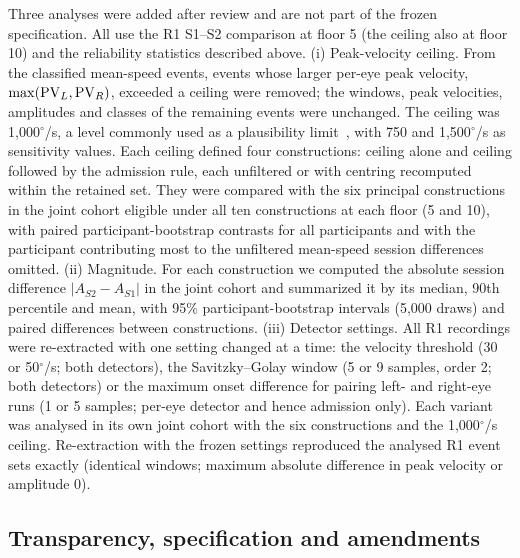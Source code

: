 Three analyses were added after review and are not part of the frozen specification. All use the R1 S1--S2 comparison at floor 5 (the ceiling also at floor 10) and the reliability statistics described above. (i) Peak-velocity ceiling. From the classified mean-speed events, events whose larger per-eye peak velocity, $\max(\mathrm{PV}_L, \mathrm{PV}_R)$, exceeded a ceiling were removed; the windows, peak velocities, amplitudes and classes of the remaining events were unchanged. The ceiling was 1,000$^\circ$/s, a level commonly used as a plausibility limit~\citep{nystrom2010}, with 750 and 1,500$^\circ$/s as sensitivity values. Each ceiling defined four constructions: ceiling alone and ceiling followed by the admission rule, each unfiltered or with centring recomputed within the retained set. They were compared with the six principal constructions in the joint cohort eligible under all ten constructions at each floor (5 and 10), with paired participant-bootstrap contrasts for all participants and with the participant contributing most to the unfiltered mean-speed session differences omitted. (ii) Magnitude. For each construction we computed the absolute session difference $|A_{S2} - A_{S1}|$ in the joint cohort and summarized it by its median, 90th percentile and mean, with 95\% participant-bootstrap intervals (5,000 draws) and paired differences between constructions. (iii) Detector settings. All R1 recordings were re-extracted with one setting changed at a time: the velocity threshold (30 or 50$^\circ$/s; both detectors), the Savitzky--Golay window (5 or 9 samples, order 2; both detectors) or the maximum onset difference for pairing left- and right-eye runs (1 or 5 samples; per-eye detector and hence admission only). Each variant was analysed in its own joint cohort with the six constructions and the 1,000$^\circ$/s ceiling. Re-extraction with the frozen settings reproduced the analysed R1 event sets exactly (identical windows; maximum absolute difference in peak velocity or amplitude 0).

\subsection{Transparency, specification and amendments}


